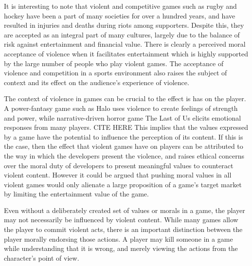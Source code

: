\documentclass{scrartcl}
\begin{document}
		It is interesting to note that violent and competitive games such as rugby and hockey have been a part of many societies for over a hundred years, and have resulted in injuries and deaths during riots among supporters. Despite this, they are accepted as an integral part of many cultures, largely due to the balance of risk against entertainment and financial value. \cite{wrongToPlayGames} There is clearly a perceived moral acceptance of violence when it facilitates entertainment which is highly supported by the large number of people who play violent games. The acceptance of violence and competition in a sports environment also raises the subject of context and its effect on the audience's experience of violence. 
		
		The context of violence in games can be crucial to the effect is has on the player. A power-fantasy game such as Halo uses violence to create feelings of strength and power, while narrative-driven horror game The Last of Us elicits emotional responses from many players. CITE HERE This implies that the values expressed by a game have the potential to influence the perception of its content. \cite{ValueViolence} If this is the case, then the effect that violent games have on players can be attributed to the way in which the developers present the violence, and raises ethical concerns over the moral duty of developers to present meaningful values to counteract violent content. However it could be argued that pushing moral values in all violent games would only alienate a large proposition of a game's target market by limiting the entertainment value of the game.
		
		Even without a deliberately created set of values or morals in a game, the player may not necessarily be influenced by violent content. While many games allow the player to commit violent acts, there is an important distinction between the player morally endorsing those actions. A player may kill someone in a game while understanding that it is wrong, and merely viewing the actions from the character's point of view. \cite{FreeWill}
	
\end{document}

